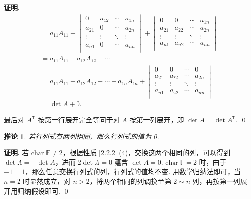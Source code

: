\documentclass[10pt,openany]{article}
\theoremstyle{thmstyle} %
\theoremstyle{defstyle} %
\newtheorem{corollary}[theorem]{推论}
\theoremstyle{prostyle} %
\theoremstyle{exastyle}
\theoremstyle{remstyle}
\renewenvironment{proof}[1][证明]{\par\underline{\textbf{#1.}} \;\fangsong}{\qed\par}
\newcommand{\T}{^{\text{T}}}
\newcommand{\F}{\mathbb{F}}
\newcommand{\tz}{\mathrm{char} \;}
\begin{document}
\begin{proof}
\begin{align*}
     	&= a_{11}A_{11}+ \begin{vmatrix}
     	0 & a_{12} & \cdots & a_{1n} \\
     	a_{21} & 0 & \cdots & a_{2n} \\
     	\vdots & \vdots & \ddots & \vdots \\
     	a_{n1} & 0 & \cdots & a_{nn} \\
     	\end{vmatrix}+\begin{vmatrix}
     	0 & 0 & \cdots & a_{1n} \\
     	a_{21} & a_{22} & \cdots & a_{2n} \\
     	\vdots & \vdots & \ddots & \vdots \\
     	a_{n1} & a_{n2} & \cdots & a_{nn} \\
     	\end{vmatrix} \\
     	&= a_{11}A_{11}+a_{12}A_{12}+\cdots \\
     	&=  a_{11}A_{11}+a_{12}A_{12}+\cdots+a_{1n}A_{1n}+ \begin{vmatrix}
     		0 & 0 & \cdots & 0 \\
     		a_{21} & a_{22} & \cdots & a_{2n} \\
     		\vdots & \vdots & \ddots & \vdots \\
     		a_{n1} & a_{n2} & \cdots & a_{nn} \\
     	\end{vmatrix} \\
     	&= \det A+0.
     \end{align*}
     
     最后对 \( A\T \) 按第一行展开完全等同于对 \( A \) 按第一列展开，即 \( \det A=\det A\T \).
\end{proof}


\begin{corollary}\label{2.2.3}
	若行列式有两列相同，那么行列式的值为 0.
	
\end{corollary}

\begin{proof}
	若 \( \tz \F \neq 2 \)，根据性质 \ref{2.2.2} (4)，交换这两个相同的列，可以得到 \( \det A=-\det A \)，进而 \( 2\det A=0 \) 蕴含 \( \det A=0 \).  \( \tz \F=2 \) 时，由于 \( -1=1 \)，那么任意交换行列式的列，行列式的值均不变. 用数学归纳法即可，当 \( n=2 \) 时显然成立，对 \( n>2 \)，将两个相同的列调换至第 \( 2 \sim n \) 列，再按第一列展开用归纳假设即可.
\end{proof}
\end{document}
